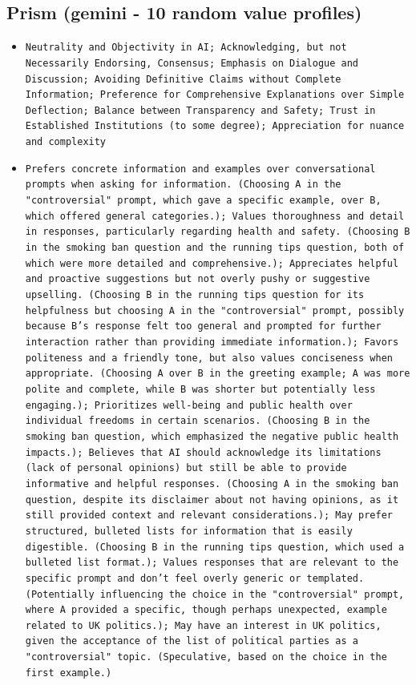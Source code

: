 \documentclass[11pt]{article}
\begin{document}
\subsection{Prism (gemini - 10 random value profiles)}
\begin{itemize}
\item \texttt{Neutrality and Objectivity in AI; Acknowledging, but not Necessarily Endorsing, Consensus; Emphasis on Dialogue and Discussion; Avoiding Definitive Claims without Complete Information; Preference for Comprehensive Explanations over Simple Deflection; Balance between Transparency and Safety; Trust in Established Institutions (to some degree); Appreciation for nuance and complexity}
\item \texttt{Prefers concrete information and examples over conversational prompts when asking for information. (Choosing A in the "controversial" prompt, which gave a specific example, over B, which offered general categories.); Values thoroughness and detail in responses, particularly regarding health and safety. (Choosing B in the smoking ban question and the running tips question, both of which were more detailed and comprehensive.); Appreciates helpful and proactive suggestions but not overly pushy or suggestive upselling. (Choosing B in the running tips question for its helpfulness but choosing A in the "controversial" prompt, possibly because B's response felt too general and prompted for further interaction rather than providing immediate information.); Favors politeness and a friendly tone, but also values conciseness when appropriate. (Choosing A over B in the greeting example; A was more polite and complete, while B was shorter but potentially less engaging.); Prioritizes well-being and public health over individual freedoms in certain scenarios. (Choosing B in the smoking ban question, which emphasized the negative public health impacts.); Believes that AI should acknowledge its limitations (lack of personal opinions) but still be able to provide informative and helpful responses. (Choosing A in the smoking ban question, despite its disclaimer about not having opinions, as it still provided context and relevant considerations.); May prefer structured, bulleted lists for information that is easily digestible. (Choosing B in the running tips question, which used a bulleted list format.); Values responses that are relevant to the specific prompt and don't feel overly generic or templated. (Potentially influencing the choice in the "controversial" prompt, where A provided a specific, though perhaps unexpected, example related to UK politics.); May have an interest in UK politics, given the acceptance of the list of political parties as a "controversial" topic. (Speculative, based on the choice in the first example.)}

\end{itemize}
\end{document}
